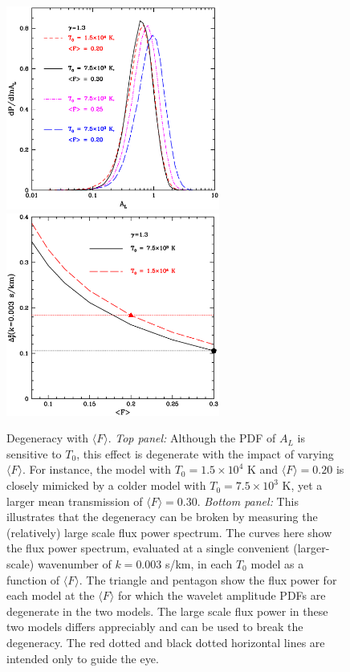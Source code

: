 \begin{figure}[t]
\includegraphics[width=7cm]{f12a.eps}
\includegraphics[width=7cm]{f12b.eps}
\caption{Degeneracy with $\langle F \rangle$. {\it Top panel:} Although the PDF of $A_L$ is sensitive
to $T_0$, this effect is degenerate with the impact of varying $\langle F \rangle$. For instance, the model with $T_0 = 1.5 \times 10^4$ K
and $\langle F \rangle = 0.20$ is closely mimicked by a colder model with $T_0=7.5 \times 10^3$ K, yet a larger mean transmission of
$\langle F \rangle = 0.30$. {\it Bottom panel:} This illustrates that the degeneracy can be broken by measuring the (relatively) large
scale flux power spectrum. The curves here show the flux power spectrum, evaluated at a single convenient (larger-scale) wavenumber of $k=0.003$ s/km, 
in each $T_0$ model as a function of $\langle F \rangle$. The triangle and pentagon show the flux power for each model at the
$\langle F \rangle$ for which the wavelet amplitude PDFs are degenerate in the two models. The large scale flux power in these
two models differs appreciably and can be used to break the degeneracy. The red dotted and black dotted horizontal lines are intended 
only to guide the eye.}
\label{fig:degen_break}
\end{figure}


